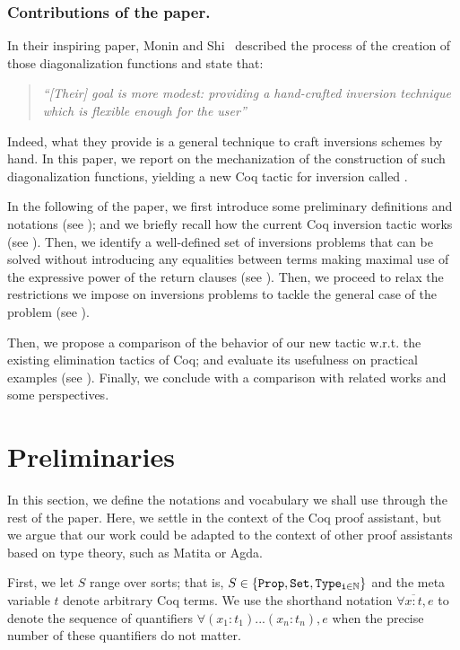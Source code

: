 \documentclass{llncs}
\begin{document}
\subsubsection{Contributions of the paper.} 
In their inspiring paper, Monin and Shi~\cite{monin-shi} described the
process of the creation of those diagonalization functions and state
that:
\begin{quote}
  \em ``[Their] goal is more modest: providing a hand-crafted
  inversion technique which is flexible enough for the
  user'' \end{quote}
%
Indeed, what they provide is a general technique to craft inversions
schemes by hand.  In this paper, we report on the mechanization of the
construction of such diagonalization functions, yielding a new Coq
tactic for inversion called .

In the following of the paper, we first introduce some preliminary
definitions and notations (see ); and we
briefly recall how the current Coq inversion tactic works (see
).
%
Then, we identify a well-defined set of inversions problems that can
be solved without introducing any equalities between terms making
maximal use of the expressive power of the return clauses (see
).
%
Then, we proceed to relax the restrictions we impose on inversions
problems to tackle the general case of the problem (see \secref{}).%

Then, we propose a comparison of the behavior of our new 
tactic w.r.t. the existing elimination tactics of Coq; and evaluate
its usefulness on practical examples (see \secref{}).
%
Finally, we conclude with a comparison with related works and some
perspectives. 

\section{Preliminaries}\label{sec:preliminaries}
In this section, we define the notations and vocabulary we shall use
through the rest of the paper. Here, we settle in the context of the
Coq proof assistant, but we argue that our work could be adapted to
the context of other proof assistants based on type theory, such as
Matita or Agda.

\renewcommand\vector[1]{\overline{#1}} 

First, we let $S$ range over sorts; that is, $S \in \left\{\tt Prop,
  Set, Type_{i \in \mathbb{N}} \right\}$ and the meta variable $t$ denote
arbitrary Coq terms. We use the shorthand notation $\forall \vector{x
  : t},e$ to denote the sequence of quantifiers $\forall (x_1:t_1)
... (x_n:t_n),e$ when the precise number of these quantifiers do not
matter.
\end{document}
